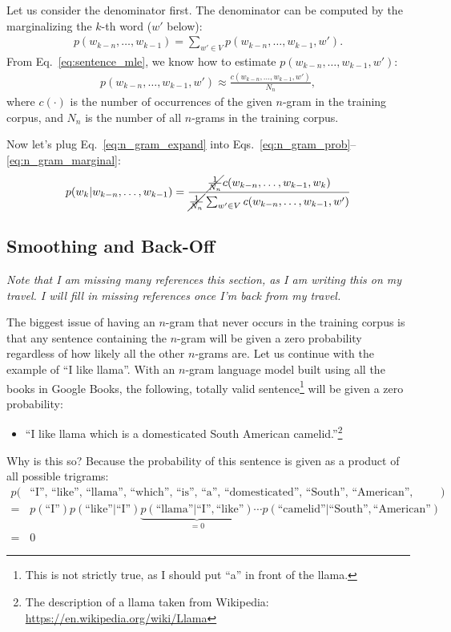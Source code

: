 \documentclass{report}
\begin{document}
Let us consider the denominator first. The denominator can be computed by the
marginalizing the $k$-th word ($w'$ below):
\begin{align}
    \label{eq:n_gram_marginal}
    p(w_{k-n}, \ldots, w_{k-1}) = \sum_{w'\in V} p(w_{k-n}, \ldots, w_{k-1}, w').
\end{align}
From Eq.~\eqref{eq:sentence_mle}, we know how to estimate $p(w_{k-n}, \ldots,
w_{k-1}, w')$:
\begin{align}
    \label{eq:n_gram_expand}
    p(w_{k-n}, \ldots, w_{k-1}, w') \approx \frac{c(w_{k-n}, \ldots, w_{k-1},
    w')}{N_n},
\end{align}
where $c(\cdot)$ is the number of occurrences of the given $n$-gram in the
training corpus, and $N_n$ is the number of all $n$-grams in the training
corpus.

Now let's plug Eq.~\eqref{eq:n_gram_expand} into
Eqs.~\eqref{eq:n_gram_prob}--\eqref{eq:n_gram_marginal}:
\begin{align}
    \label{eq:n_gram_mle}
    p(w_k | w_{k-n}, \ldots, w_{k-1}) = \frac{
        \cancel{\frac{1}{N_n}}
        c(w_{k-n}, \ldots, w_{k-1}, w_k)}
    {
        \cancel{\frac{1}{N_n}} \sum_{w' \in V} c(w_{k-n}, \ldots, w_{k-1},
    w')
}
\end{align}

\subsection{Smoothing and Back-Off}

{\em Note that I am missing many references this section, as I am writing this
    on my travel. I will fill in missing references once I'm back from my
travel.}

The biggest issue of having an $n$-gram that never occurs in the training corpus
is that any sentence containing the $n$-gram will be given a zero probability
regardless of how likely all the other $n$-grams are. Let us continue with the
example of ``I like llama''. With an $n$-gram language model built using all the
books in Google Books, the following, totally valid sentence\footnote{
    This is not strictly true, as I should put ``a'' in front of the llama.
}
will be given a
zero probability:
\begin{itemize}
    \itemsep 0em
    \item ``I like llama which is a domesticated South American
        camelid.''\footnote{
            The description of a llama taken from Wikipedia:
            \url{https://en.wikipedia.org/wiki/Llama}
        }
\end{itemize}
Why is this so? Because the probability of this sentence is given as a product
of all possible trigrams:
\begin{align*}
    p(&\text{``I'', ``like'', ``llama'', ``which'', ``is'', ``a'',
        ``domesticated'', ``South'',
    ``American'', ``camelid''}) \\
    =& p(\text{``I''}) p(\text{``like''}|\text{``I''})
    \underbrace{p(\text{``llama''}|\text{``I''}, \text{``like''})}_{=0} \cdots
    p(\text{``camelid''}|\text{``South''}, \text{``American''}) \\
    =& 0
\end{align*}
\end{document}

